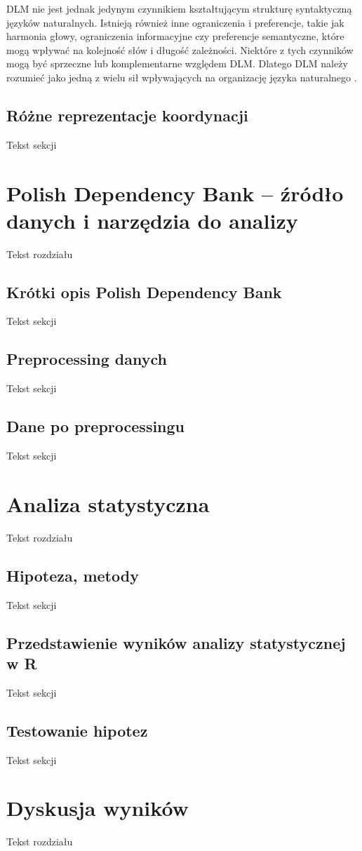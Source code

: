 \documentclass[licencjacka]{pracamgr_Kogni}
\begin{document}
DLM nie jest jednak jedynym czynnikiem kształtującym strukturę syntaktyczną języków naturalnych. Istnieją również inne ograniczenia i preferencje, takie jak harmonia głowy, ograniczenia informacyjne czy preferencje semantyczne, które mogą wpływać na kolejność słów i długość zależności. Niektóre z tych czynników mogą być sprzeczne lub komplementarne względem DLM. Dlatego DLM należy rozumieć jako jedną z wielu sił wpływających na organizację języka naturalnego \citep{Temperley2018}.

\section{Różne reprezentacje koordynacji}
Tekst sekcji

\chapter{Polish Dependency Bank -- źródło danych i narzędzia do analizy}
Tekst rozdziału
\section{Krótki opis Polish Dependency Bank}
Tekst sekcji
\section{Preprocessing danych}
Tekst sekcji
\section{Dane po preprocessingu}
Tekst sekcji

\chapter{Analiza statystyczna}
Tekst rozdziału
\section{Hipoteza, metody}
Tekst sekcji
\section{Przedstawienie wyników analizy statystycznej w R}
Tekst sekcji
\section{Testowanie hipotez}
Tekst sekcji

\chapter{Dyskusja wyników}
Tekst rozdziału
\end{document}
